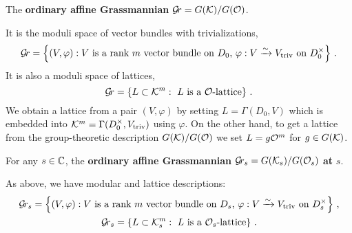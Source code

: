 \documentclass{article} %
\begin{document}



\begin{definition}
\label{def:gr}
     The \textbf{ordinary affine Grassmannian} $\mathcal{G}\!r = G(\mathcal K)/G(\mathcal O)$.
\end{definition}    
It is the moduli space of vector bundles with trivializations,
$$
\mathcal{G}\!r = 
    \left\{ 
        (V, \varphi) : \text{$V$ is a rank $m$ vector bundle on $ D_0 $, $\varphi : V \xrightarrow{\sim} V_{\mathrm{triv}} $ on $ D_0^\times $} 
    \right\} \,. 
$$
It is also a moduli space of lattices, 
$$ 
\mathcal{G}\!r = 
    \left\{ L \subset \mathcal K^m : \text{ $L$ is a $\mathcal O$-lattice} \right\}\,.
$$
% 
We obtain a lattice from a pair $ (V,\varphi) $ by setting $ L = \Gamma(D_0, V)$ which is embedded into $ \mathcal K^m = \Gamma(D_0^\times, V_{\mathrm{triv}})$ using $ \varphi$.  
On the other hand, to get a lattice from the group-theoretic description $ G(\mathcal K) / G(\mathcal O) $ we set $ L = g \mathcal O^m$ for $ g \in G(\mathcal K)$.
% 
\begin{definition}
\label{def:grs}
 For any $ s \in \mathbb C $, 
    the \textbf{ordinary affine Grassmannian} $\mathcal{G}\!r_s = G(\mathcal K_s)/G(\mathcal O_s)$ \textbf{at} $ s $. 
\end{definition}    
As above, we have modular and lattice descriptions:
\begin{gather*}
\mathcal{G}\!r_s = 
    \left\{ (
        V, \varphi) : \text{$V$ is a rank $m$ vector bundle on $ D_s $, $\varphi : V \xrightarrow{\sim} V_{\mathrm{triv}} $ on $ D^\times_s $} 
    \right\}\,, \\
\mathcal{G}\!r_s = 
    \left\{ 
        L \subset \mathcal K_s^m : \text{ $L$ is a $\mathcal O_s$-lattice} 
    \right\} \,. 
\end{gather*}
% 
\end{document}
